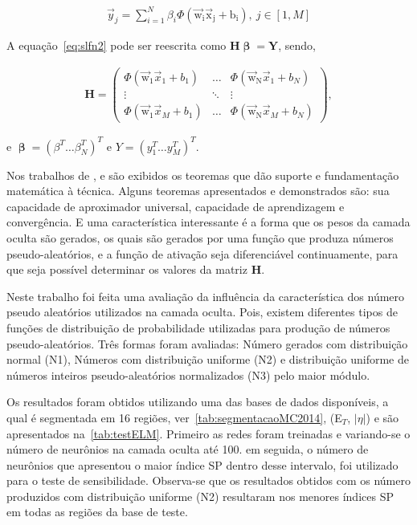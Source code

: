 \begin{apendicesenv}
\begin{eqnarray}
\vec{y}_j = \sum_{i=1}^{N} \beta_i \Phi \mathrm{(\vec{w}_i\vec{x}_j + b_i)}, \: j \in [1,M]\label{eq:slfn2}
\end{eqnarray}

A equação~\ref{eq:slfn2} pode ser reescrita como $\mathbf{H}\boldsymbol{\upbeta} = \mathbf{Y}$, sendo,
\begin{small}
	\begin{eqnarray}
	\mathbf{H} =
	\left( \begin{array}{ccc}
	\Phi(\mathrm{\vec{w}_1}\vec{x}_1 + b_1) & \ldots & \Phi(\mathrm{\vec{w}_N}\vec{x}_1 + b_N) \\
	\vdots      & \ddots & \vdots \\
	\Phi(\mathrm{\vec{w}_1}\vec{x}_M + b_1) & \ldots & \Phi(\mathrm{\vec{w}_N}\vec{x}_M + b_N)
	\end{array} \right), \label{eq:slfn_mat2}
	\end{eqnarray}
\end{small}
e $\boldsymbol{\upbeta} = (\beta^T \ldots \beta^T_N)^T$ e $Y = (y^T_1 \ldots y^T_M)^T$.

Nos trabalhos de ,  e  são exibidos os teoremas que dão suporte e fundamentação matemática à técnica. Alguns teoremas apresentados e demonstrados são: sua capacidade de aproximador universal, capacidade de aprendizagem e  convergência. E uma característica interessante é a forma que os pesos da camada oculta são gerados, os quais são gerados por uma função que produza números pseudo-aleatórios, e a função de ativação seja diferenciável continuamente, para que seja possível determinar os valores da matriz  $\mathbf{H}$.

Neste trabalho foi feita uma avaliação da influência da característica dos número pseudo aleatórios utilizados na camada oculta. Pois, existem diferentes tipos de funções de distribuição de probabilidade utilizadas para produção de números pseudo-aleatórios. Três formas foram avaliadas: Número gerados com distribuição normal (N1), Números com distribuição uniforme (N2) e distribuição uniforme de números inteiros pseudo-aleatórios normalizados (N3) pelo maior módulo.

Os resultados foram obtidos utilizando uma das bases de dados disponíveis, a qual é segmentada em 16 regiões, ver~\autoref{tab:segmentacaoMC2014}, (E$_T$, $|\eta|$) e são apresentados na~\autoref{tab:testELM}. Primeiro as redes foram treinadas e variando-se o número de neurônios na camada oculta até 100. em seguida, o número de neurônios que apresentou o maior índice SP dentro desse intervalo, foi utilizado para o teste de sensibilidade. Observa-se que os resultados obtidos com os número produzidos com distribuição uniforme (N2) resultaram nos menores índices SP em todas as regiões da base de teste.


\end{apendicesenv}
